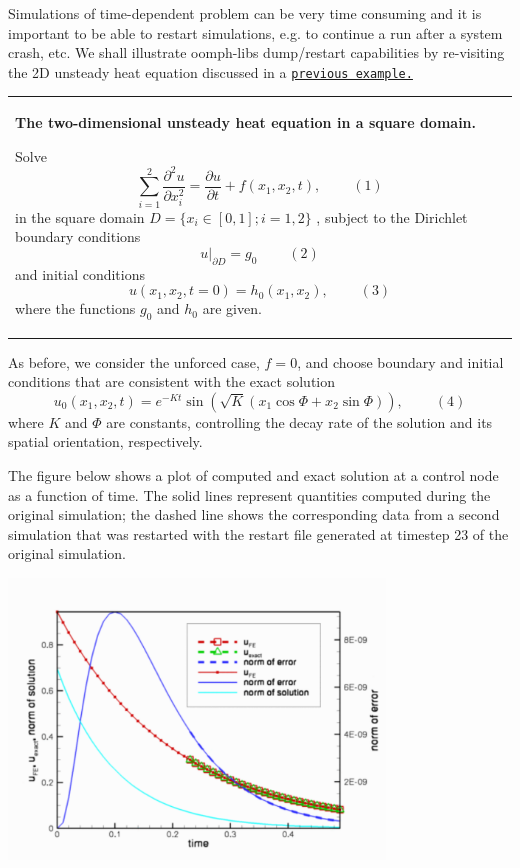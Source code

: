 Simulations of time-\/dependent problem can be very time consuming and it is important to be able to restart simulations, e.\+g. to continue a run after a system crash, etc. We shall illustrate {\ttfamily oomph-\/lib\textquotesingle{}s} dump/restart capabilities by re-\/visiting the 2D unsteady heat equation discussed in a \href{../../two_d_unsteady_heat/html/index.html}{\tt previous example.}

\begin{center} \tabulinesep=1mm
\begin{longtabu} spread 0pt [c]{*{1}{|X[-1]}|}
\hline
\begin{center} {\bfseries The two-\/dimensional unsteady heat equation in a square domain.} \end{center}  Solve \[ \sum_{i=1}^2\frac{\partial^2 u}{\partial x_i^2} = \frac{\partial u}{\partial t} + f\left(x_1,x_2,t\right), \ \ \ \ \ \ \ \ \ \ (1) \] in the square domain $ D = \{x_i \in [0,1]; i=1,2 \} $ , subject to the Dirichlet boundary conditions \[ \left. u\right|_{\partial D}=g_0 \ \ \ \ \ \ \ \ \ \ (2) \] and initial conditions \[ u(x_1,x_2,t=0)=h_0(x_1,x_2), \ \ \ \ \ \ \ \ \ \ (3) \] where the functions $ g_0 $ and $ h_0 $ are given.   \\
\end{longtabu}
\end{center} 

As before, we consider the unforced case, $ f=0 $, and choose boundary and initial conditions that are consistent with the exact solution \[ u_0(x_1,x_2,t) = e^{-Kt}\sin\left( \sqrt{K} \left( x_1 \cos \Phi + x_2 \sin \Phi\right)\right), \ \ \ \ \ \ \ \ \ \ (4) \] where $ K $ and $ \Phi $ are constants, controlling the decay rate of the solution and its spatial orientation, respectively.

The figure below shows a plot of computed and exact solution at a control node as a function of time. The solid lines represent quantities computed during the original simulation; the dashed line shows the corresponding data from a second simulation that was restarted with the restart file generated at timestep 23 of the original simulation.

 
\begin{DoxyImage}
\includegraphics[width=0.75\textwidth]{trace}
\end{DoxyImage}


